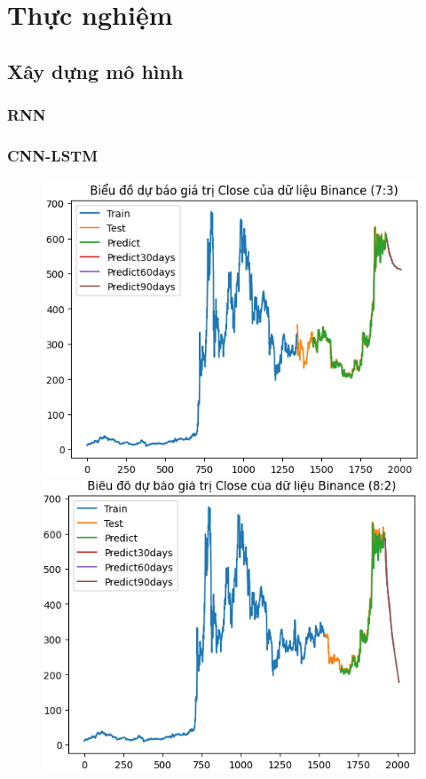 \documentclass[conference]{IEEEtran}
\begin{document}
\section{Thực nghiệm}

\subsection{Xây dựng mô hình}

\subsubsection{RNN}

\subsubsection{CNN-LSTM}
\begin{figure}[H]
    \centering
    \begin{minipage}{0.15\textwidth}
    \centering
    \includegraphics[width=1\textwidth]{Figure/RNN_BNB73.png}
    \end{minipage}
    \hfill
    \begin{minipage}{0.15\textwidth}
    \centering
    \includegraphics[width=1\textwidth]{Figure/RNN_BNB82.png}

\end{minipage}
\end{figure}
\end{document}

